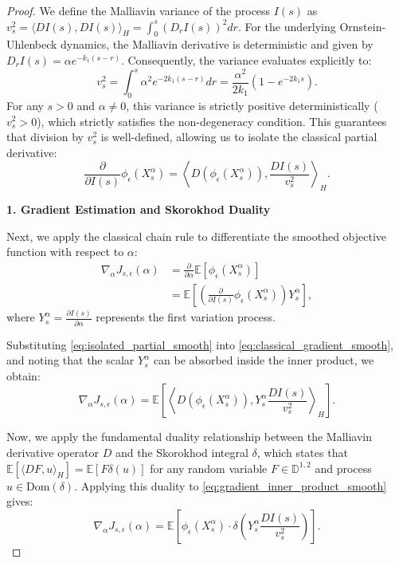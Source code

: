 \documentclass[11pt]{article}
\begin{document}
\begin{proof}
We define the Malliavin variance of the process $I(s)$ as $v_s^2 = \langle DI(s), DI(s) \rangle_H = \int_0^s (D_r I(s))^2 dr$. For the underlying Ornstein-Uhlenbeck dynamics, the Malliavin derivative is deterministic and given by $D_r I(s) = \alpha e^{-k_1(s-r)}$. Consequently, the variance evaluates explicitly to:
\begin{equation}
    v_s^2 = \int_0^s \alpha^2 e^{-2k_1(s-r)} dr = \frac{\alpha^2}{2k_1}(1 - e^{-2k_1 s}).
\end{equation}
For any $s > 0$ and $\alpha \neq 0$, this variance is strictly positive deterministically ($v_s^2 > 0$), which strictly satisfies the non-degeneracy condition. This guarantees that division by $v_s^2$ is well-defined, allowing us to isolate the classical partial derivative:
\begin{equation}\label{eq:isolated_partial_smooth}
    \frac{\partial}{\partial I(s)} \phi_\epsilon(X_s^\alpha) = \left\langle D \left( \phi_\epsilon(X_s^\alpha) \right), \frac{DI(s)}{v_s^2} \right\rangle_H.
\end{equation}

\textbf{1. Gradient Estimation and Skorokhod Duality}

Next, we apply the classical chain rule to differentiate the smoothed objective function with respect to $\alpha$:
\begin{align}\label{eq:classical_gradient_smooth}
    \nabla_\alpha J_{s,\epsilon}(\alpha) &= \frac{\partial}{\partial \alpha} \mathbb{E} \left[ \phi_\epsilon(X_s^\alpha) \right] \nonumber\\
    &= \mathbb{E} \left[ \left( \frac{\partial}{\partial I(s)} \phi_\epsilon(X_s^\alpha) \right) Y_s^\alpha \right], 
\end{align}
where $Y_s^\alpha = \frac{\partial I(s)}{\partial \alpha}$ represents the first variation process. 

Substituting \eqref{eq:isolated_partial_smooth} into \eqref{eq:classical_gradient_smooth}, and noting that the scalar $Y_s^\alpha$ can be absorbed inside the inner product, we obtain:
\begin{equation} \label{eq:gradient_inner_product_smooth}
    \nabla_\alpha J_{s,\epsilon}(\alpha) = \mathbb{E} \left[ \left\langle D \left( \phi_\epsilon(X_s^\alpha) \right), Y_s^\alpha \frac{DI(s)}{v_s^2} \right\rangle_H \right].
\end{equation}

Now, we apply the fundamental duality relationship between the Malliavin derivative operator $D$ and the Skorokhod integral $\delta$, which states that $\mathbb{E}[\langle DF, u \rangle_H] = \mathbb{E}[F \delta(u)]$ for any random variable $F \in \mathbb{D}^{1,2}$ and process $u \in \text{Dom}(\delta)$. Applying this duality to \eqref{eq:gradient_inner_product_smooth} gives:
\begin{equation}
    \nabla_\alpha J_{s,\epsilon}(\alpha) = \mathbb{E} \left[ \phi_\epsilon(X_s^\alpha) \cdot \delta \left( Y_s^\alpha \frac{DI(s)}{v_s^2} \right) \right].
\end{equation}


\end{proof}
\end{document}
